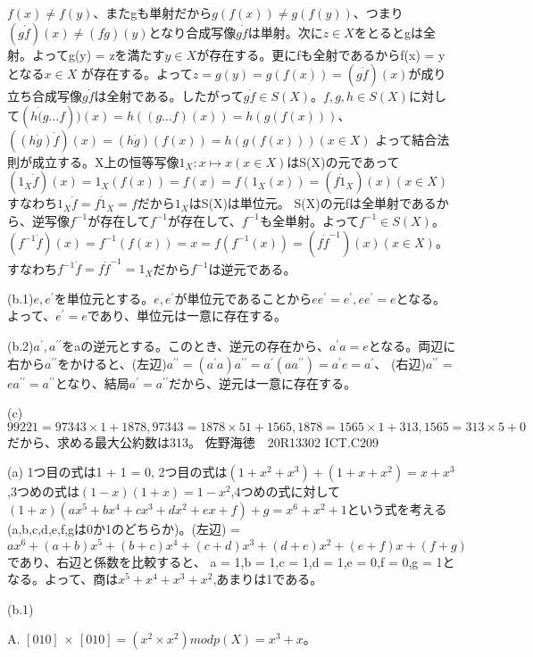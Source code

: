 \documentclass[11pt]{jsarticle}
\begin{document}
$f(x) \neq f(y)$、またgも単射だから$g(f(x)) \neq g(f(y))$、つまり$(g \dot f)(x) \neq (f \dot g)(y)$となり合成写像$g \dot f$は単射。次に$z \in X$をとるとgは全射。よってg(y) = zを満たす$y \in X$が存在する。更にfも全射であるからf(x) = yとなる$x \in X$
が存在する。よって$z = g(y) = g(f(x)) = (g \dot f)(x)$が成り立ち合成写像$g \dot f$は全射である。したがって$g \dot f \in S(X)$。$f,g,h \in S(X)$に対して$(h \dot (g\dots f))(x) = h((g \dots f)(x)) = h(g(f(x)))$、$((h \dot g) \dot f)(x) = (h \dot g)(f(x)) = h(g(f(x))) (x \in X)$
よって結合法則が成立する。X上の恒等写像$1_X:x \mapsto x(x \in X)$はS(X)の元であって$(1_X \dot f)(x) = 1_X(f(x)) = f(x) = f(1_X(x)) = (f \dot 1_X)(x) (x \in X)$すなわち$1_X \dot f = f \dot 1_X = f$だから$1_X$はS(X)は単位元。
S(X)の元fは全単射であるから、逆写像$f^{-1}$が存在して$f^{-1}$が存在して、$f^{-1}$も全単射。よって$f^{-1} \in S(X)$。
$(f^{-1}\dot f)(x) = f^{-1}(f(x)) = x = f(f^{-1}(x)) = (f \dot f^{-1})(x)(x \in X)$。すなわち$f^{-1} \dot f = f \dot f^{-1} = 1_X$だから$f^{-1}$は逆元である。
\par(b.1)$e,e^{\prime}$を単位元とする。$e,e^{\prime}$が単位元であることから$ee^{\prime} = e^{\prime}, ee^{\prime} = e$となる。よって、$e^{\prime} = e$であり、単位元は一意に存在する。
\par(b.2)$a^{\prime} ,a^{\prime\prime}$をaの逆元とする。このとき、逆元の存在から、$a^{\prime} a = e$となる。両辺に右から$a^{\prime\prime}$をかけると、(左辺)$a^{\prime\prime} = (a^{\prime} a)a^{\prime\prime} = a^{\prime}(a a^{\prime\prime}) = a^{\prime} e = a^{\prime}$、
(右辺)$a^{\prime\prime}$ = $ea^{\prime\prime} = a^{\prime\prime}$となり、結局$a^{\prime} = a^{\prime\prime}$だから、逆元は一意に存在する。
\par(c)$99221 = 97343 \times 1 + 1878, 97343 = 1878 \times 51 + 1565, 1878 = 1565 \times 1 +313, 1565 = 313 \times 5 + 0$だから、求める最大公約数は313。\newpage
佐野海徳　20R13302 ICT.C209 \\
\par (a) 1つ目の式は1 + 1 = 0, 2つ目の式は$(1 + x^2 + x^3) + (1 + x + x^2) = x + x^3$,3つめの式は$(1 - x)(1 + x) = 1 - x^2$,4つめの式に対して
$(1 + x)(ax^5 + bx^4 + cx^3 + dx^2 + ex + f) + g = x^6 + x^2 + 1$という式を考える(a,b,c,d,e,f,gは0か1のどちらか)。(左辺) = $ax^6 + (a + b)x^5 + (b + c)x^4 + (c + d)x^3 + (d + e)x^2 + (e + f)x + (f + g)$であり、右辺と係数を比較すると、
a = 1,b = 1,c = 1,d = 1,e = 0,f = 0,g = 1となる。よって、商は$x^5 + x^4 + x^3 + x^2$,あまりは1である。
\par (b.1)
\par A. $[010]$ $\times$ $[010] = (x^2 \times x^2) mod p(X) = x^3 + x$。
\end{document}
